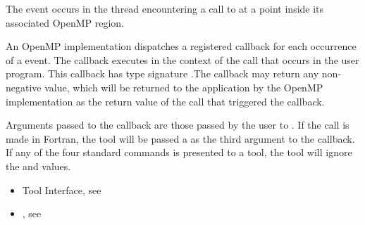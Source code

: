 \events

The  event occurs in the thread encountering a call
to  at a point inside its associated OpenMP region.

\tools

An OpenMP implementation dispatches a registered
 callback for each occurrence of a
 event.  The callback executes in the context of the
call that occurs in the user program.  This callback has type
signature .The callback may return
any non-negative value, which will be returned to the application by
the OpenMP implementation as the return value of the
 call that triggered the callback.


Arguments passed to the callback are those passed by the user to
. If the call is made in Fortran, the tool will be
passed a  as the third argument to the callback. If any of the four standard commands is
presented to a tool, the tool will ignore the  and  values.



\crossreferences
\begin{itemize}
\item Tool Interface, see
\item {}, see 
\end{itemize}



